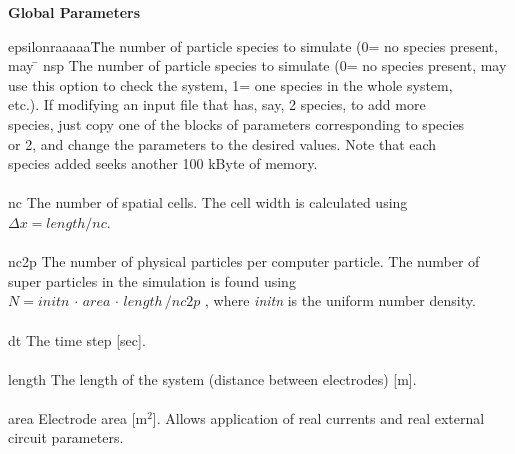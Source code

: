 \begin{section}
\begin{subsection}
 \begin{subsubsection}
{\bf Global Parameters}
\begin{tabbing}
      epsilonraaaaa\=    The number of particle species to simulate (0= no species
                    present, may \= \kill
     nsp    \>       The number of particle species to simulate (0= no species
                    present, may \> \\
	    \>      use this option to check the system, 1= one
                    species in the whole system, \> \\
	    \>      etc.).  If modifying an input
                    file that has, say, 2 species, to add more \> \\
	    \>      species, just
                    copy one of the blocks of parameters corresponding to
                    species \> \\
	     or 2, and change the parameters to the desired
                    values.  Note that each \> \\
	    \>      species added seeks another 100
                    kByte of memory. \> \\
					\\
      nc    \>      The number of spatial cells.  The cell width is calculated using \> \\
       	    \>      {\em$\Delta x = length / nc$}. \> \\
							\\
      nc2p  \>      The number of physical particles per computer particle.
                    The number of \> \\
	    \>      super particles in the simulation is found
                    using \> \\
	    \> 	    {\em$N = initn \, \cdot \, area \, \cdot \, length\, /nc2p $}
			, where
                    {\em initn} is the uniform number density. \> \\
							\\
      dt    \>      The time step [sec]. \> \\
						\\
      length \>     The length of the system (distance between electrodes) [m]. \> \\
									\\
      area   \>     Electrode area [{\rm m$^{2}$}]. Allows application of real currents
                    and real external \> \\
	     \>     circuit parameters. \> \\

\end{tabbing}
\end{subsubsection}
\end{subsection}
\end{section}
